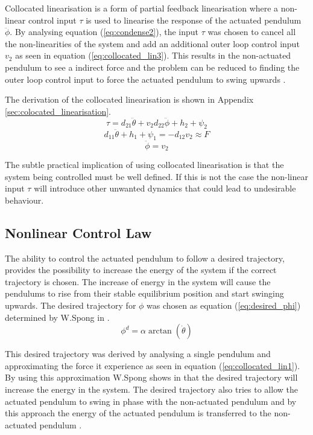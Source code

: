 Collocated linearisation is a form of partial feedback linearisation where a non-linear control input $\tau$ is used to linearise the response of the actuated pendulum $\ddot{\phi}$. By analysing equation (\ref{eq:condense2}), the input $\tau$ was chosen to cancel all the non-linearities of the system and add an additional outer loop control input $v_{2}$ as seen in equation (\ref{eq:collocated_lin3}). This results in the non-actuated pendulum to see a indirect force and the problem can be reduced to finding the outer loop control input to force the actuated pendulum to swing upwards \citep{spong_swingup}.

 The derivation of the collocated linearisation is shown in Appendix \ref{sec:colocated_linearisation}.
\begin{equation} \label{eq:collocated_lin3}
\tau = d_{21}\ddot{\theta} + v_{2}d_{22}\ddot{\phi} + h_{2} + \psi_{2}
\end{equation}
\begin{equation} \label{eq:collocated_lin1}
d_{11}\ddot{\theta} + h_{1} + \psi_{1} = -d_{12}v_{2} \approx F
\end{equation}
\begin{equation} \label{eq:collocated_lin2}
\ddot{\phi} = v_{2}
\end{equation}

The subtle practical implication of using collocated linearisation is that the system being controlled must be well defined. If this is not the case the non-linear input $\tau$ will introduce other unwanted dynamics that could lead to undesirable behaviour.

\subsection{Nonlinear Control Law}

The ability to control the actuated pendulum to follow a desired trajectory, provides the possibility to increase the energy of the system if the correct trajectory is chosen. The increase of energy in the system will cause the pendulums to rise from their stable equilibrium position and start swinging upwards. The desired trajectory for ${\phi}$ was chosen as equation (\ref{eq:desired_phi}) determined by W.Spong in \citep{spong_swingup}.
\begin{equation} \label{eq:desired_phi}
\phi^{d} =  \alpha \arctan(\dot{\theta})
\end{equation}

This desired trajectory was derived by analysing a single pendulum and approximating the force it experience as seen in equation (\ref{eq:collocated_lin1}). By using this approximation W.Spong shows in \citet{spong_swingup} that the desired trajectory will increase the energy in the system. The desired trajectory also tries to allow the actuated pendulum to swing in phase with the non-actuated pendulum and by this approach the energy of the actuated pendulum is transferred to the non-actuated pendulum \citep{spong_swingup}.\\

